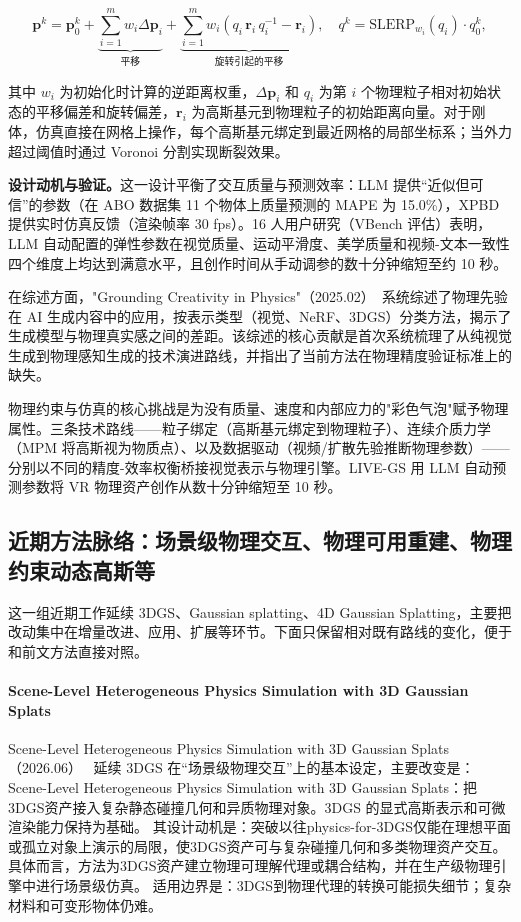 \begin{equation}
\mathbf{p}^k = \mathbf{p}_0^k + \underbrace{\sum_{i=1}^{m} w_i \Delta \mathbf{p}_i}_{\text{平移}} + \underbrace{\sum_{i=1}^{m} w_i (q_i \, \mathbf{r}_i \, q_i^{-1} - \mathbf{r}_i)}_{\text{旋转引起的平移}}, \quad q^k = \text{SLERP}_{w_i}(q_i) \cdot q_0^k,
\end{equation}

其中 $w_i$ 为初始化时计算的逆距离权重，$\Delta \mathbf{p}_i$ 和 $q_i$ 为第 $i$ 个物理粒子相对初始状态的平移偏差和旋转偏差，$\mathbf{r}_i$ 为高斯基元到物理粒子的初始距离向量。对于刚体，仿真直接在网格上操作，每个高斯基元绑定到最近网格的局部坐标系；当外力超过阈值时通过 Voronoi 分割实现断裂效果。

\textbf{设计动机与验证。}这一设计平衡了交互质量与预测效率：LLM 提供``近似但可信''的参数（在 ABO 数据集 11 个物体上质量预测的 MAPE 为 15.0\%），XPBD 提供实时仿真反馈（渲染帧率 30 fps）。16 人用户研究（VBench 评估）表明，LLM 自动配置的弹性参数在视觉质量、运动平滑度、美学质量和视频-文本一致性四个维度上均达到满意水平，且创作时间从手动调参的数十分钟缩短至约 10 秒。

在综述方面，"Grounding Creativity in Physics"（2025.02）~\cite{2502_07007}系统综述了物理先验在 AI 生成内容中的应用，按表示类型（视觉、NeRF、3DGS）分类方法，揭示了生成模型与物理真实感之间的差距。该综述的核心贡献是首次系统梳理了从纯视觉生成到物理感知生成的技术演进路线，并指出了当前方法在物理精度验证标准上的缺失。

\begin{takeaway}
物理约束与仿真的核心挑战是为没有质量、速度和内部应力的"彩色气泡"赋予物理属性。三条技术路线——粒子绑定（高斯基元绑定到物理粒子）、连续介质力学（MPM 将高斯视为物质点）、以及数据驱动（视频/扩散先验推断物理参数）——分别以不同的精度-效率权衡桥接视觉表示与物理引擎。LIVE-GS 用 LLM 自动预测参数将 VR 物理资产创作从数十分钟缩短至 10 秒。
\end{takeaway}

\subsection{近期方法脉络：场景级物理交互、物理可用重建、物理约束动态高斯等}

这一组近期工作延续 3DGS、Gaussian splatting、4D Gaussian Splatting，主要把改动集中在增量改进、应用、扩展等环节。下面只保留相对既有路线的变化，便于和前文方法直接对照。

\paragraph{Scene-Level Heterogeneous Physics Simulation with 3D Gaussian Splats}
Scene-Level Heterogeneous Physics Simulation with 3D Gaussian Splats（2026.06）~\cite{2606_21753} 延续 3DGS 在“场景级物理交互”上的基本设定，主要改变是：Scene-Level Heterogeneous Physics Simulation with 3D Gaussian Splats：把3DGS资产接入复杂静态碰撞几何和异质物理对象。3DGS 的显式高斯表示和可微渲染能力保持为基础。
其设计动机是：突破以往physics-for-3DGS仅能在理想平面或孤立对象上演示的局限，使3DGS资产可与复杂碰撞几何和多类物理资产交互。
具体而言，方法为3DGS资产建立物理可理解代理或耦合结构，并在生产级物理引擎中进行场景级仿真。
适用边界是：3DGS到物理代理的转换可能损失细节；复杂材料和可变形物体仍难。

